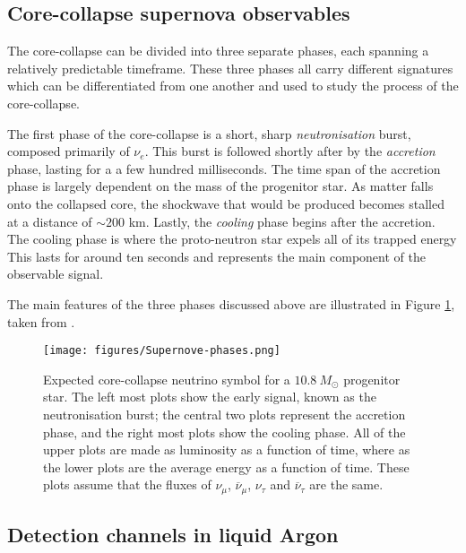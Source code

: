 \subsection{Core-collapse supernova observables}
The core-collapse can be divided into three separate phases, each spanning a relatively predictable timeframe. 
These three phases all carry different signatures which can be differentiated from one another and used to study the process of the core-collapse.

The first phase of the core-collapse is a short, sharp \textit{neutronisation} burst, composed primarily of $\nu_{e}$.
This burst is followed shortly after by the \textit{accretion} phase, lasting for a a few hundred milliseconds. 
The time span of the accretion phase is largely dependent on the mass of the progenitor star.
As matter falls onto the collapsed core, the shockwave that would be produced becomes stalled at a distance of $\sim 200$ km.
Lastly, the \textit{cooling} phase begins after the accretion.
The cooling phase is where the proto-neutron star expels all of its trapped energy
This lasts for around ten seconds and represents the main component of the observable signal.

The main features of the three phases discussed above are illustrated in Figure \ref{fig:core-collapse-phases}, taken from \cite{WURM2012685}.

\begin{figure}[h] %
   \centering
   \texttt{[image: figures/Supernove-phases.png]} 
   \caption{Expected core-collapse neutrino symbol for a $10.8\ M_{\odot}$ progenitor star. The left most plots show the early signal, known as the neutronisation burst; the central two plots represent the accretion phase, and the right most plots show the cooling phase. All of the upper plots are made as luminosity as a function of time, where as the lower plots are the average energy as a function of time. These plots assume that the fluxes of $\nu_{\mu}$, $\overline{\nu}_{\mu}$, $\nu_{\tau}$ and $\overline{\nu}_{\tau}$ are the same.}
   \label{fig:core-collapse-phases}
\end{figure}

\subsection{Detection channels in liquid Argon}










































